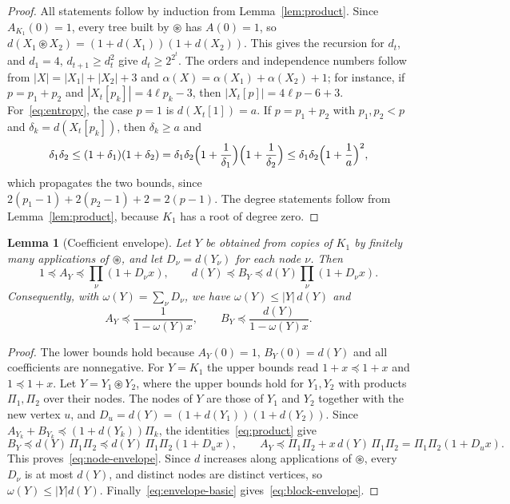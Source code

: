 \documentclass[11pt]{amsart}
\newtheorem{lemma}[theorem]{Lemma}
\theoremstyle{definition}
\theoremstyle{remark}
\numberwithin{equation}{section}
\newcommand{\cs}{\circledast}
\begin{document}
\begin{proof}
All statements follow by induction from Lemma~\ref{lem:product}. Since $A_{K_1}(0)=1$, every tree built by $\cs$ has $A(0)=1$, so $d(X_1\cs X_2)=(1+d(X_1))(1+d(X_2))$. This gives the recursion for $d_t$, and $d_1=4$, $d_{t+1}\ge d_t^2$ give $d_t\ge2^{2^t}$. The orders and independence numbers follow from $|X|=|X_1|+|X_2|+3$ and $\alpha(X)=\alpha(X_1)+\alpha(X_2)+1$; for instance, if $p=p_1+p_2$ and $|X_t[p_k]|=4\ell p_k-3$, then $|X_t[p]|=4\ell p-6+3$. For~\eqref{eq:entropy}, the case $p=1$ is $d(X_t[1])=a$. If $p=p_1+p_2$ with $p_1,p_2<p$ and $\delta_k=d(X_t[p_k])$, then $\delta_k\ge a$ and
\[
\delta_1\delta_2\le(1+\delta_1)(1+\delta_2)=\delta_1\delta_2\Bigl(1+\frac1{\delta_1}\Bigr)\Bigl(1+\frac1{\delta_2}\Bigr)\le\delta_1\delta_2\Bigl(1+\frac1a\Bigr)^2,
\]
which propagates the two bounds, since $2(p_1-1)+2(p_2-1)+2=2(p-1)$. The degree statements follow from Lemma~\ref{lem:product}, because $K_1$ has a root of degree zero.
\end{proof}

\begin{lemma}[Coefficient envelope]\label{lem:envelope}
Let $Y$ be obtained from copies of $K_1$ by finitely many applications of $\cs$, and let $D_\nu=d(Y_\nu)$ for each node $\nu$. Then
\begin{equation}\label{eq:node-envelope}
1\preceq A_Y\preceq\prod_\nu(1+D_\nu x),\qquad d(Y)\preceq B_Y\preceq d(Y)\prod_\nu(1+D_\nu x).
\end{equation}
Consequently, with $\omega(Y)=\sum_\nu D_\nu$, we have $\omega(Y)\le|Y|\,d(Y)$ and
\begin{equation}\label{eq:block-envelope}
A_Y\preceq\frac1{1-\omega(Y)x},\qquad B_Y\preceq\frac{d(Y)}{1-\omega(Y)x}.
\end{equation}
\end{lemma}

\begin{proof}
The lower bounds hold because $A_Y(0)=1$, $B_Y(0)=d(Y)$ and all coefficients are nonnegative. For $Y=K_1$ the upper bounds read $1+x\preceq1+x$ and $1\preceq1+x$. Let $Y=Y_1\cs Y_2$, where the upper bounds hold for $Y_1,Y_2$ with products $\Pi_1,\Pi_2$ over their nodes. The nodes of $Y$ are those of $Y_1$ and $Y_2$ together with the new vertex $u$, and $D_u=d(Y)=(1+d(Y_1))(1+d(Y_2))$. Since $A_{Y_k}+B_{Y_k}\preceq(1+d(Y_k))\Pi_k$, the identities~\eqref{eq:product} give
\[
B_Y\preceq d(Y)\,\Pi_1\Pi_2\preceq d(Y)\,\Pi_1\Pi_2(1+D_ux),\qquad A_Y\preceq\Pi_1\Pi_2+x\,d(Y)\,\Pi_1\Pi_2=\Pi_1\Pi_2(1+D_ux).
\]
This proves~\eqref{eq:node-envelope}. Since $d$ increases along applications of $\cs$, every $D_\nu$ is at most $d(Y)$, and distinct nodes are distinct vertices, so $\omega(Y)\le|Y|d(Y)$. Finally~\eqref{eq:envelope-basic} gives~\eqref{eq:block-envelope}.
\end{proof}
\end{document}
